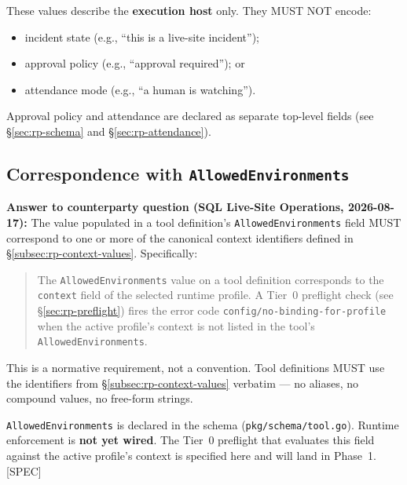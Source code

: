 \noindent These values describe the \textbf{execution host} only.  They MUST NOT
encode:
\begin{itemize}[noitemsep]
  \item incident state (e.g., ``this is a live-site incident'');
  \item approval policy (e.g., ``approval required''); or
  \item attendance mode (e.g., ``a human is watching'').
\end{itemize}

Approval policy and attendance are declared as separate top-level fields (see
\S\ref{sec:rp-schema} and \S\ref{sec:rp-attendance}).

\subsection{Correspondence with \texttt{AllowedEnvironments}}
\label{subsec:rp-allowed-environments}

\textbf{Answer to counterparty question (SQL Live-Site Operations, 2026-08-17):}
The value populated in a tool definition's \texttt{AllowedEnvironments} field
MUST correspond to one or more of the canonical context identifiers defined in
\S\ref{subsec:rp-context-values}.  Specifically:

\begin{quote}
  The \texttt{AllowedEnvironments} value on a tool definition corresponds to the
  \texttt{context} field of the selected runtime profile.  A Tier~0 preflight
  check (see \S\ref{sec:rp-preflight}) fires the error code
  \texttt{config/no-binding-for-profile} when the active profile's context is
  not listed in the tool's \texttt{AllowedEnvironments}.
\end{quote}

\noindent This is a normative requirement, not a convention.  Tool definitions MUST
use the identifiers from \S\ref{subsec:rp-context-values} verbatim — no aliases,
no compound values, no free-form strings.

\begin{tcolorbox}[colback=yellow!10, colframe=orange!60, title=Implementation Status]
  \texttt{AllowedEnvironments} is declared in the schema
  (\texttt{pkg/schema/tool.go}).  Runtime enforcement is \textbf{not yet wired}.
  The Tier~0 preflight that evaluates this field against the active profile's
  context is specified here and will land in Phase~1.  [SPEC]
\end{tcolorbox}

